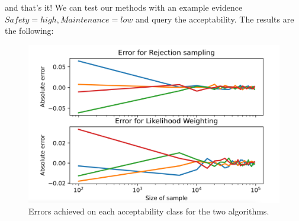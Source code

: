 and that's it! We can test our methods with an example evidence $Safety=high,Maintenance=low$ and query the acceptability. The results are the following:
\begin{figure}[ht]
    \centering\includegraphics[width=0.8\linewidth]{figures/errors.png}
    \caption{Errors achieved on each acceptability class for the two algorithms.}
    \label{fig:errors}
\end{figure}

